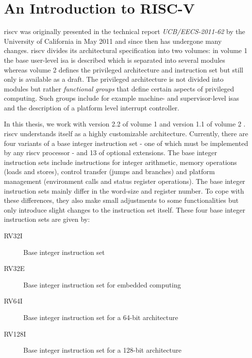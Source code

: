 
\section{An Introduction to RISC-V}
\label{sec:risc-v-intro}

\gls{riscv} was originally presented in the technical report \textit{UCB/EECS-2011-62} by the University of California in May 2011 \cite{RiscVISA-org} and since then has undergone many changes.
\gls{riscv} divides its architectural specification into two volumes: in volume 1 the base user-level \gls{isa} is described which is separated into several modules whereas volume 2 defines the privileged architecture and instruction set but still only is available as a draft.
The privileged architecture is not divided into modules but rather \textit{functional groups} that define certain aspects of privileged computing.
Such groups include for example machine- and supervisor-level \glspl{isa} and the description of a platform level interrupt controller.


In this thesis, we work with version 2.2 of volume 1 \cite{RiscVISA} and version 1.1 of volume 2 \cite{RiscVISAP}.
\gls{riscv} understands itself as a highly customizable architecture.
Currently, there are four variants of a base integer instruction set - one of which must be implemented by any \gls{riscv} processor - and 13 of optional extensions.
The base integer instruction sets include instructions for integer arithmetic, memory operations (loads and stores), control transfer (jumps and branches) and platform management (environment calls and status register operations).
The base integer instruction sets mainly differ in the word-size and register number.
To cope with these differences, they also make small adjustments to some functionalities but only introduce slight changes to the instruction set itself.
These four base integer instruction sets are given by:
\begin{description}
    \item[RV32I] Base integer instruction set
    \item[RV32E] Base integer instruction set for embedded computing
    \item[RV64I] Base integer instruction set for a 64-bit architecture
    \item[RV128I] Base integer instruction set for a 128-bit architecture
\end{description}

